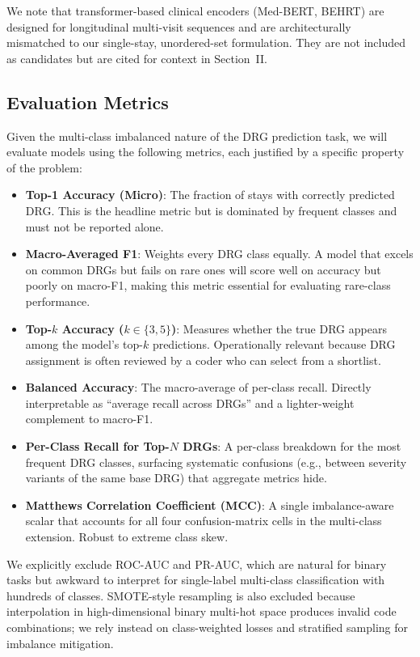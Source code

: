 We note that transformer-based clinical encoders (Med-BERT, BEHRT) are designed for longitudinal multi-visit sequences and are architecturally mismatched to our single-stay, unordered-set formulation. They are not included as candidates but are cited for context in Section~II.

\subsection{Evaluation Metrics}

Given the multi-class imbalanced nature of the DRG prediction task, we will evaluate models using the following metrics, each justified by a specific property of the problem:

\begin{itemize}
    \item \textbf{Top-1 Accuracy (Micro)}: The fraction of stays with correctly predicted DRG. This is the headline metric but is dominated by frequent classes and must not be reported alone.

    \item \textbf{Macro-Averaged F1}: Weights every DRG class equally. A model that excels on common DRGs but fails on rare ones will score well on accuracy but poorly on macro-F1, making this metric essential for evaluating rare-class performance.

    \item \textbf{Top-$k$ Accuracy ($k \in \{3, 5\}$)}: Measures whether the true DRG appears among the model's top-$k$ predictions. Operationally relevant because DRG assignment is often reviewed by a coder who can select from a shortlist.

    \item \textbf{Balanced Accuracy}: The macro-average of per-class recall. Directly interpretable as ``average recall across DRGs'' and a lighter-weight complement to macro-F1.

    \item \textbf{Per-Class Recall for Top-$N$ DRGs}: A per-class breakdown for the most frequent DRG classes, surfacing systematic confusions (e.g., between severity variants of the same base DRG) that aggregate metrics hide.

    \item \textbf{Matthews Correlation Coefficient (MCC)}: A single imbalance-aware scalar that accounts for all four confusion-matrix cells in the multi-class extension. Robust to extreme class skew.
\end{itemize}

We explicitly exclude ROC-AUC and PR-AUC, which are natural for binary tasks but awkward to interpret for single-label multi-class classification with hundreds of classes. SMOTE-style resampling is also excluded because interpolation in high-dimensional binary multi-hot space produces invalid code combinations; we rely instead on class-weighted losses and stratified sampling for imbalance mitigation.
